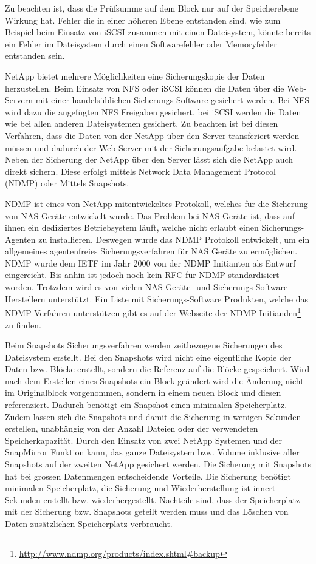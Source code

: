 Zu beachten ist, dass die Prüfsumme auf dem Block nur auf der Speicherebene Wirkung hat. Fehler die in einer höheren Ebene entstanden sind, wie zum Beispiel beim Einsatz von iSCSI zusammen mit einen Dateisystem, könnte bereits ein Fehler im Dateisystem durch einen Softwarefehler oder Memoryfehler entstanden sein. 

NetApp bietet mehrere Möglichkeiten eine Sicherungskopie der Daten herzustellen. Beim Einsatz von NFS oder iSCSI können die Daten über die Web-Servern mit einer handelsüblichen Sicherungs-Software gesichert werden. Bei NFS wird dazu die angefügten NFS Freigaben gesichert, bei iSCSI werden die Daten wie bei allen anderen Dateisystemen gesichert. Zu beachten ist bei diesen Verfahren, dass die Daten von der NetApp über den Server transferiert werden müssen und dadurch der Web-Server mit der Sicherungsaufgabe belastet wird. Neben der Sicherung der NetApp über den Server lässt sich die NetApp auch direkt sichern. Diese erfolgt mittels Network Data Management Protocol (NDMP) oder Mittels Snapshots. 

NDMP ist eines von NetApp mitentwickeltes Protokoll, welches für die Sicherung von NAS Geräte entwickelt wurde. Das Problem bei NAS Geräte ist, dass auf ihnen ein dediziertes Betriebsystem läuft, welche nicht erlaubt einen Sicherungs-Agenten zu installieren. Deswegen wurde das NDMP Protokoll entwickelt, um ein allgemeines agentenfreies Sicherungsverfahren für NAS Geräte zu ermöglichen. NDMP wurde dem IETF im Jahr 2000 von der NDMP Initianten als Entwurf eingereicht. Bis anhin ist jedoch noch kein RFC für NDMP standardisiert worden. Trotzdem wird es von vielen NAS-Geräte- und Sicherungs-Software- Herstellern unterstützt. Ein Liste mit Sicherungs-Software Produkten, welche das NDMP Verfahren unterstützen gibt es auf der Webseite der NDMP Initianden\footnote{\url{http://www.ndmp.org/products/index.shtml#backup}} zu finden. \cite{NDMP.orga}\cite{NDMP.org}

Beim Snapshots Sicherungsverfahren werden zeitbezogene Sicherungen des Dateisystem erstellt. Bei den Snapshots wird nicht eine eigentliche Kopie der Daten bzw. Blöcke erstellt, sondern die Referenz auf die Blöcke gespeichert. Wird nach dem Erstellen eines Snapshots ein Block geändert wird die Änderung nicht im Originalblock vorgenommen, sondern in einem neuen Block und diesen referenziert. Dadurch benötigt ein Snapshot einen minimalen Speicherplatz. Zudem lassen sich die Snapshots und damit die Sicherung in wenigen Sekunden erstellen, unabhängig von der Anzahl Dateien oder der verwendeten Speicherkapazität. Durch den Einsatz von zwei NetApp Systemen und der SnapMirror Funktion kann, das ganze Dateisystem bzw. Volume inklusive aller Snapshots auf der zweiten NetApp gesichert werden. Die Sicherung mit Snapshots hat bei grossen Datenmengen entscheidende Vorteile. Die Sicherung benötigt minimalen Speicherplatz, die Sicherung und Wiederherstellung ist innert Sekunden erstellt bzw. wiederhergestellt. Nachteile sind, dass der Speicherplatz mit der Sicherung bzw. Snapshots geteilt werden muss und das Löschen von Daten zusätzlichen Speicherplatz verbraucht.

